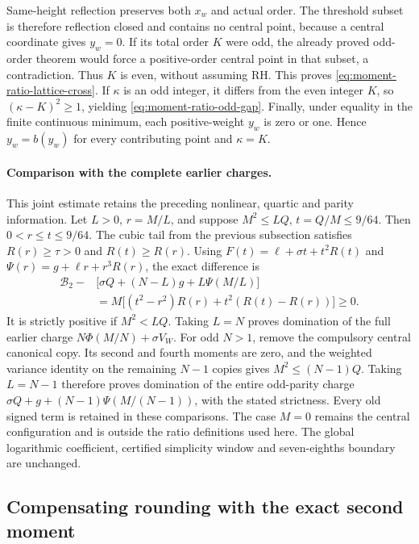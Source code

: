 Same-height reflection preserves both \(x_w\) and actual order.
The threshold subset is therefore reflection closed and contains no
central point, because a central coordinate gives \(y_w=0\).
If its total order \(K\) were odd, the already proved odd-order theorem
would force a positive-order central point in that subset, a contradiction.
Thus \(K\) is even, without assuming RH.  This proves
\eqref{eq:moment-ratio-lattice-cross}.
If \(\kappa\) is an odd integer, it differs from the even integer
\(K\), so \((\kappa-K)^2\ge1\), yielding
\eqref{eq:moment-ratio-odd-gap}.
Finally, under equality in the finite continuous minimum, each
positive-weight \(y_w\) is zero or one.  Hence \(y_w=b(y_w)\)
for every contributing point and \(\kappa=K\).

\paragraph{Comparison with the complete earlier charges.}
This joint estimate retains the preceding nonlinear, quartic and parity
information.  Let \(L>0\), \(r=M/L\), and suppose
\(M^2\le LQ\), \(t=Q/M\le9/64\).
Then \(0<r\le t\le9/64\).  The cubic tail from the previous subsection
satisfies \(R(r)\ge\tau>0\) and \(R(t)\ge R(r)\).
Using \(F(t)=\ell+\sigma t+t^2R(t)\) and
\(\Psi(r)=g+\ell r+r^3R(r)\), the exact difference is
\begin{align*}
 \mathcal B_2-&\bigl[\sigma Q+(N-L)g+L\Psi(M/L)\bigr]\\
 &=M\bigl[(t^2-r^2)R(r)+t^2(R(t)-R(r))\bigr]\ge0.
\end{align*}
It is strictly positive if \(M^2<LQ\).
Taking \(L=N\) proves domination of the full earlier charge
\(N\Phi(M/N)+\sigma V_W\).
For odd \(N>1\), remove the compulsory central canonical copy.
Its second and fourth moments are zero, and the weighted variance identity
on the remaining \(N-1\) copies gives \(M^2\le(N-1)Q\).
Taking \(L=N-1\) therefore proves domination of the entire odd-parity
charge \(\sigma Q+g+(N-1)\Psi(M/(N-1))\), with the stated strictness.
Every old signed term is retained in these comparisons.
The case \(M=0\) remains the central configuration and is outside the
ratio definitions used here.  The global logarithmic coefficient,
certified simplicity window and seven-eighths boundary are unchanged.

\subsection{Compensating rounding with the exact second moment}
\label{sec:compensated-moment-lattice}

